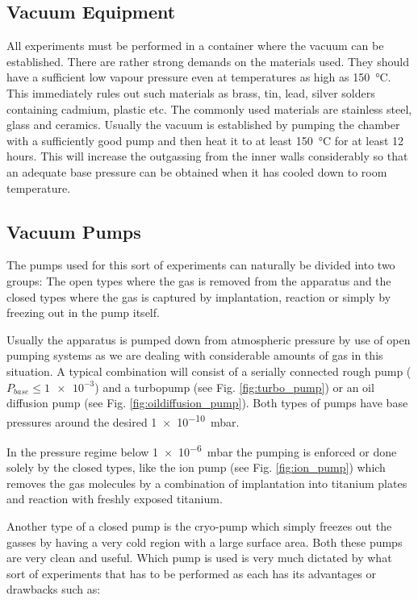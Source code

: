\subsection{Vacuum Equipment}
All experiments must be performed in a container where the vacuum can be established. There are rather strong demands on the materials used. They should have a sufficient low vapour pressure even at temperatures as high as \SI{150}{\degreeCelsius}. This immediately rules out such materials as brass, tin, lead, silver solders containing cadmium, plastic etc. The commonly used materials are stainless steel, glass and ceramics. Usually the vacuum is established by pumping the chamber with a sufficiently good pump and then heat it to at least \SI{150}{\degreeCelsius} for at least 12 hours. This will increase the outgassing from the inner walls considerably so that an adequate base pressure can be obtained when it has cooled down to room temperature.

\subsection{Vacuum Pumps}
The pumps used for this sort of experiments can naturally be divided into two groups: The open types where the gas is removed from the apparatus and the closed types where the gas is captured by implantation, reaction or simply by freezing out in the pump itself.

Usually the apparatus is pumped down from atmospheric pressure by use of open pumping systems as we are dealing with considerable amounts of gas in this situation. A typical combination will consist of a serially connected rough pump ($P_{base} \leq \num{1e-3}$) and a turbopump (see Fig. \ref{fig:turbo_pump}) or an oil diffusion pump (see Fig. \ref{fig:oildiffusion_pump}). Both types of pumps have base pressures around the desired \SI{1e-10}{mbar}.

In the pressure regime below \SI{1e-6}{mbar} the pumping is enforced or done solely by the closed types, like the ion pump (see Fig. \ref{fig:ion_pump}) which removes the gas molecules by a combination of implantation into titanium plates and reaction with freshly exposed titanium.

Another type of a closed pump is the cryo-pump which simply freezes out the gasses by having a very cold region with a large surface area. Both these pumps are very clean and useful. Which pump is used is very much dictated by what sort of experiments that has to be performed as each has its advantages or drawbacks such as:

